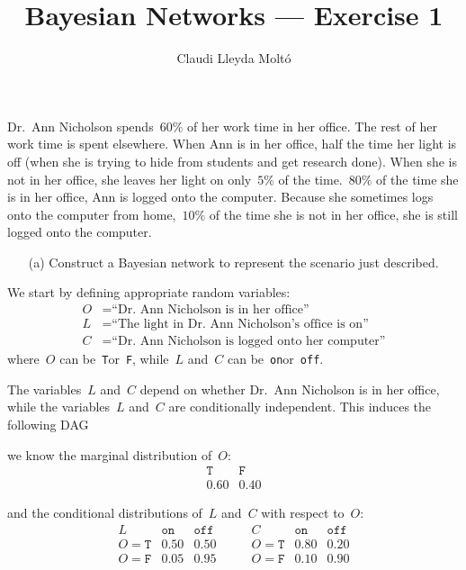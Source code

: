 \documentclass[a4paper]{article}
\title{Bayesian Networks --- Exercise 1}
\author{Claudi Lleyda Moltó}
\newcommand{\T}{\texttt{T}}
\newcommand{\F}{\texttt{F}}
\newcommand{\on}{\texttt{on}}
\newcommand{\off}{\texttt{off}}
\begin{document}
\maketitle

Dr.\ Ann Nicholson spends~\(60\%\) of her work time in her office. The rest of
her work time is spent elsewhere. When Ann is in her office, half the time her
light is off (when she is trying to hide from students and get research done).
When she is not in her office, she leaves her light on only~\(5\%\) of the
time.~\(80\%\) of the time she is in her office, Ann is logged onto the
computer.  Because she sometimes logs onto the computer from home,~\(10\%\) of
the time she is not in her office, she is still logged onto the computer.

\begin{enumerate}
    \item[(a)] Construct a Bayesian network to represent the scenario just
        described.
\end{enumerate}

We start by defining appropriate random variables:
\begin{align*}
    O &= \textrm{``Dr.\ Ann Nicholson is in her office''} \\
    L &= \textrm{``The light in Dr.\ Ann Nicholson's office is on''} \\
    C &= \textrm{``Dr.\ Ann Nicholson is logged onto her computer''}
\end{align*}
where~\(O\) can be~\T or~\F, while~\(L\) and~\(C\) can be~\on or~\off.

The variables~\(L\) and~\(C\) depend on whether Dr.\ Ann Nicholson is in her
office, while the variables~\(L\) and~\(C\) are conditionally independent. This
induces the following DAG

\begin{center}
\end{center}

we know the marginal distribution of~\(O\):
\[
    \begin{array}{cc}
        \T   & \F   \\ \hline
        0.60 & 0.40
    \end{array}
\]

and the conditional distributions of~\(L\) and~\(C\) with respect to~\(O\):
\[
    \begin{array}{c|cc}
        L      & \on  & \off \\ \hline
        O = \T & 0.50 & 0.50 \\
        O = \F & 0.05 & 0.95
    \end{array}
    \qquad
    \begin{array}{c|cc}
        C      & \on   & \off \\ \hline
        O = \T & 0.80  & 0.20 \\
        O = \F & 0.10  & 0.90
    \end{array}
\]
\end{document}
